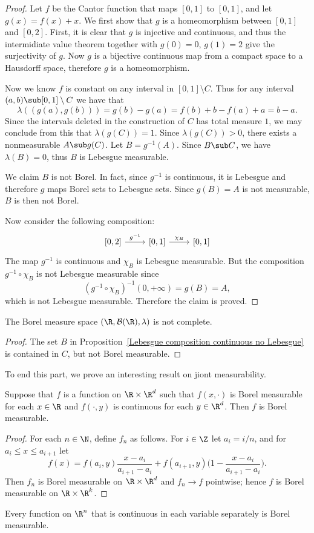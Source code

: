 \begin{proof}
Let $f$ be the Cantor function that maps $[0,1]$ to $[0,1]$, and let $g(x)=f(x)+x$. We first show that $g$ is a homeomorphism between $[0,1]$ and $[0,2]$. First, it is clear that $g$ is injective and continuous, and thus the intermidiate value theorem together with $g(0)=0$, $g(1)=2$ give the surjectivity of $g$. Now $g$ is a bijective continuous map from a compact space to a Hausdorff space, therefore $g$ is a homeomorphism.\par
Now we know $f$ is constant on any interval in $[0,1]\setminus C$. Thus for any interval $(a,b)\sub[0,1]\setminus C$ we have that
\[\lambda((g(a),g(b)))=g(b)-g(a)=f(b)+b-f(a)+a=b-a.\]
Since the intervals deleted in the construction of $C$ has total measure $1$, we may conclude from this that $\lambda(g(C))=1$. Since $\lambda(g(C))>0$, there exists a nonmeasurable $A\sub g(C)$. Let $B=g^{-1}(A)$. Since $B\sub C$, we have $\lambda(B)=0$, thus $B$ is Lebesgue measurable.\par
We claim $B$ is not Borel. In fact, since $g^{-1}$ is continuous, it is Lebesgue and therefore $g$ maps Borel sets to Lebesgue sets. Since $g(B)=A$ is not measurable, $B$ is then not Borel.\par
Now consider the following composition:
\[\begin{tikzcd}
{[0,2]}\ar[r,"g^{-1}"]&{[0,1]}\ar[r,"\chi_B"]&{[0,1]}
\end{tikzcd}\]
The map $g^{-1}$ is continuous and $\chi_{B}$ is Lebesgue measurable. But the composition $g^{-1}\circ\chi_B$ is not Lebesgue measurable since
\[(g^{-1}\circ\chi_B)^{-1}(0,+\infty)=g(B)=A,\]
which is not Lebesgue measurable. Therefore the claim is proved.
\end{proof}
\begin{corollary}
The Borel measure space $(\R,\mathcal{B}(\R),\lambda)$ is not complete.
\end{corollary}
\begin{proof}
The set $B$ in Proposition~\ref{Lebesgue composition continuous no Lebesgue} is contained in $C$, but not Borel measurable.
\end{proof}
To end this part, we prove an interesting result on jiont measurability.
\begin{proposition}
Suppose that $f$ is a function on $\R\times\R^d$ such that $f(x,\cdot)$ is Borel measurable for each $x\in\R$ and $f(\cdot,y)$ is continuous for each $y\in\R^d$. Then $f$ is Borel measurable.
\end{proposition}
\begin{proof}
For each $n\in\N$, define $f_n$ as follows. For $i\in\Z$ let $a_i=i/n$, and for $a_i\leq x\leq a_{i+1}$ let
\[f(x)=f(a_i,y)\frac{x-a_i}{a_{i+1}-a_i}+f(a_{i+1},y)\Big(1-\frac{x-a_{i}}{a_{i+1}-a_i}\Big).\]
Then $f_n$ is Borel measurable on $\R\times\R^d$ and $f_n\to f$ pointwise; hence $f$ is Borel measurable on $\R\times\R^k$.
\end{proof}
\begin{corollary}
Every function on $\R^n$ that is continuous in each variable separately is Borel measurable.
\end{corollary}
